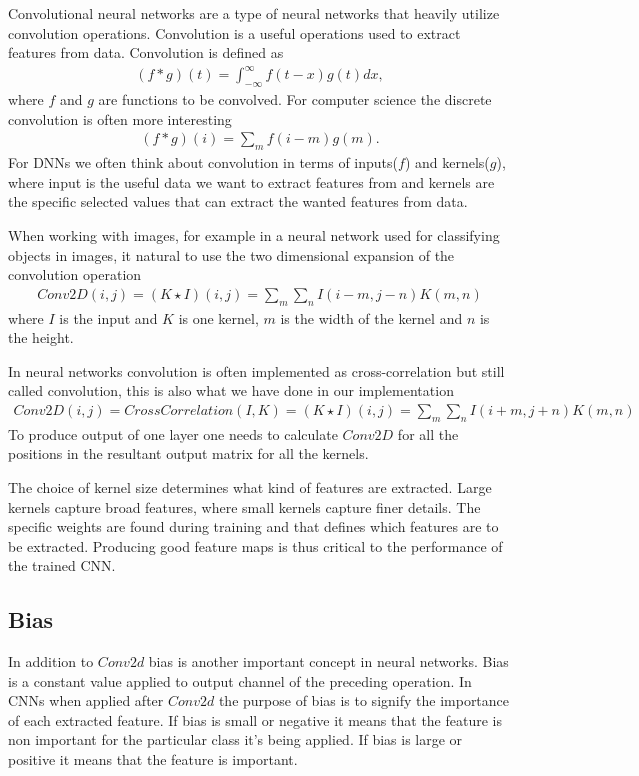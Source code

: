 \documentclass[12pt,a4paper,english
]{tunithesis}
\begin{document}
Convolutional neural networks are a type of neural networks that heavily utilize convolution operations. Convolution is a useful operations used to extract features from data.
Convolution is defined as
\begin{align}
  (f \ast g)(t) = \int_{-\infty}^{\infty}f(t-x)g(t)dx,
\end{align}
where $f$ and $g$ are functions to be convolved. For computer science the discrete convolution is often more interesting
\begin{align}
  (f \ast g)(i) = \sum_{m}f(i-m)g(m).
\end{align}
For DNNs we often think about convolution in terms of inputs($f$) and kernels($g$), where input is the useful data we want to extract features from and kernels are the specific selected values that can extract the wanted features from data.

When working with images, for example in a neural network used for classifying objects in images, it  natural to use the two dimensional expansion of the convolution operation
\begin{align}
  Conv2D(i, j) = (K \star I)(i,j) = \sum_{m}\sum_{n}I(i-m,j-n)K(m, n)
\end{align}
where $I$ is the input and $K$ is one kernel, $m$ is the width of the kernel and $n$ is the height.

In neural networks convolution is often implemented as cross-correlation but still called convolution, this is also what we have done in our implementation
\begin{align}
  Conv2D(i,j) = CrossCorrelation(I, K) = (K \star I)(i,j) = \sum_{m}\sum_{n}I(i+m,j+n)K(m, n)
\end{align}
To produce output of one layer one needs to calculate $Conv2D$ for all the positions in the resultant output matrix for all the kernels.

The choice of kernel size determines what kind of features are extracted. Large kernels capture broad features, where small kernels capture finer details.
The specific weights are found during training and that defines which features are to be extracted. Producing good feature maps is thus critical to the performance of the trained CNN.

\subsection{Bias}
In addition to $Conv2d$ bias is another important concept in neural networks. Bias is a constant value applied to output channel of the preceding operation. In CNNs when applied after $Conv2d$ the purpose of bias is to signify the importance of each extracted feature. If bias is small or negative it means that the feature is non important for the particular class it's being applied. If bias is large or positive it means that the feature is important.
\end{document}
